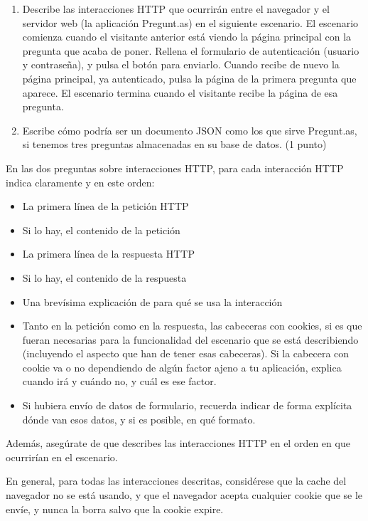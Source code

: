 \begin{enumerate}
\item Describe las interacciones HTTP que ocurrirán entre el navegador y el servidor web (la aplicación Pregunt.as) en el siguiente escenario. El escenario comienza cuando el visitante anterior está viendo la página principal con la pregunta que acaba de poner. Rellena el formulario de autenticación (usuario y contraseña), y pulsa el botón para enviarlo. Cuando recibe de nuevo la página principal, ya autenticado, pulsa la página de la primera pregunta que aparece. El escenario termina cuando el visitante recibe la página de esa pregunta.

\item Escribe cómo podría ser un documento JSON como los que sirve Pregunt.as, si tenemos tres preguntas almacenadas en su base de datos. (1 punto)

\end{enumerate}

  En las dos preguntas sobre interacciones HTTP, para cada interacción HTTP indica claramente y en este orden:
  \begin{itemize}
  \item La primera línea de la petición HTTP
  \item Si lo hay, el contenido de la petición
  \item La primera línea de la respuesta HTTP
  \item Si lo hay, el contenido de la respuesta
  \item Una brevísima explicación de para qué se usa la interacción
  \item Tanto en la petición como en la respuesta, las cabeceras con cookies, si es que fueran necesarias para la funcionalidad del escenario que se está describiendo (incluyendo el aspecto que han de tener esas cabeceras). Si la cabecera con cookie va o no dependiendo de algún factor ajeno a tu aplicación, explica cuando irá y cuándo no, y cuál es ese factor.
  \item Si hubiera envío de datos de formulario, recuerda indicar de forma explícita dónde van esos datos, y si es posible, en qué formato.
  \end{itemize}

  Además, asegúrate de que describes las interacciones HTTP en el orden en que ocurrirían en el escenario.

  En general, para todas las interacciones descritas, considérese que la cache del navegador no se está usando, y que el navegador acepta cualquier cookie que se le envíe, y nunca la borra salvo que la cookie expire.


